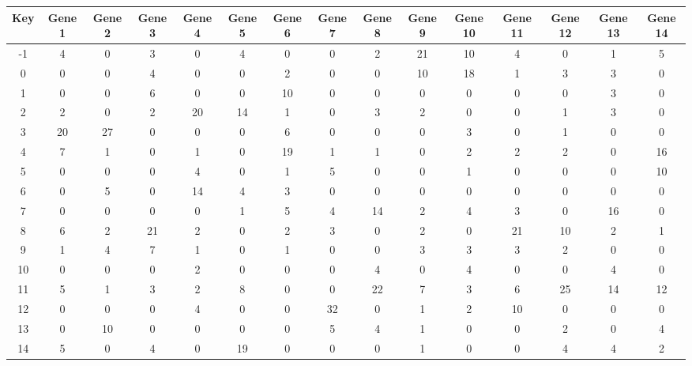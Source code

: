 \begin{tabular}{|c|c|c|c|c|c|c|c|c|c|c|c|c|c|c|}
\hline
Key & Gene 1 & Gene 2 & Gene 3 & Gene 4 & Gene 5 & Gene 6 & Gene 7 & Gene 8 & Gene 9 & Gene 10 & Gene 11 & Gene 12 & Gene 13 & Gene 14 \\
\hline
-1 & 4 & 0 & 3 & 0 & 4 & 0 & 0 & 2 & 21 & 10 & 4 & 0 & 1 & 5 \\
0 & 0 & 0 & 4 & 0 & 0 & 2 & 0 & 0 & 10 & 18 & 1 & 3 & 3 & 0 \\
1 & 0 & 0 & 6 & 0 & 0 & 10 & 0 & 0 & 0 & 0 & 0 & 0 & 3 & 0 \\
2 & 2 & 0 & 2 & 20 & 14 & 1 & 0 & 3 & 2 & 0 & 0 & 1 & 3 & 0 \\
3 & 20 & 27 & 0 & 0 & 0 & 6 & 0 & 0 & 0 & 3 & 0 & 1 & 0 & 0 \\
4 & 7 & 1 & 0 & 1 & 0 & 19 & 1 & 1 & 0 & 2 & 2 & 2 & 0 & 16 \\
5 & 0 & 0 & 0 & 4 & 0 & 1 & 5 & 0 & 0 & 1 & 0 & 0 & 0 & 10 \\
6 & 0 & 5 & 0 & 14 & 4 & 3 & 0 & 0 & 0 & 0 & 0 & 0 & 0 & 0 \\
7 & 0 & 0 & 0 & 0 & 1 & 5 & 4 & 14 & 2 & 4 & 3 & 0 & 16 & 0 \\
8 & 6 & 2 & 21 & 2 & 0 & 2 & 3 & 0 & 2 & 0 & 21 & 10 & 2 & 1 \\
9 & 1 & 4 & 7 & 1 & 0 & 1 & 0 & 0 & 3 & 3 & 3 & 2 & 0 & 0 \\
10 & 0 & 0 & 0 & 2 & 0 & 0 & 0 & 4 & 0 & 4 & 0 & 0 & 4 & 0 \\
11 & 5 & 1 & 3 & 2 & 8 & 0 & 0 & 22 & 7 & 3 & 6 & 25 & 14 & 12 \\
12 & 0 & 0 & 0 & 4 & 0 & 0 & 32 & 0 & 1 & 2 & 10 & 0 & 0 & 0 \\
13 & 0 & 10 & 0 & 0 & 0 & 0 & 5 & 4 & 1 & 0 & 0 & 2 & 0 & 4 \\
14 & 5 & 0 & 4 & 0 & 19 & 0 & 0 & 0 & 1 & 0 & 0 & 4 & 4 & 2 \\
\hline
\end{tabular}